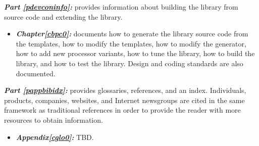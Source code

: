 \begin{itemize}
\end{itemize}
%
\emph{\textbf{Part \ref{pdevconinfo}: \pdevconinfolongtitle{}}} provides 
information about building the library from source code and
extending the library.

\begin{itemize}
\item \emph{\textbf{Chapter\postchapterwordnonstretchable{}\ref{cbpc0}: 
      \cbpczerolongtitlenoemph{}}} 
      documents how to generate the library source code from
      the templates, how to modify the templates, how to
      modify the generator, how to add new processor variants,
      how to tune the library, how to build the library, and how
      to test the library.  Design and coding standards are also
      documented.
\end{itemize}

\emph{\textbf{Part \ref{pappbibidx}: \pappbibidxlongtitle{}}}
provides glossaries, references, and an index.  Individuals, 
products, companies, websites, and Internet newsgroups are 
cited in the same framework as traditional references in 
order to provide the reader with more resources to obtain 
information.  

\begin{itemize}
\item \emph{\textbf{Appendix\postchapterwordnonstretchable{}\ref{cglo0}: 
      \cglozerolongtitlenoemph{}}} 
      TBD.
\end{itemize}

